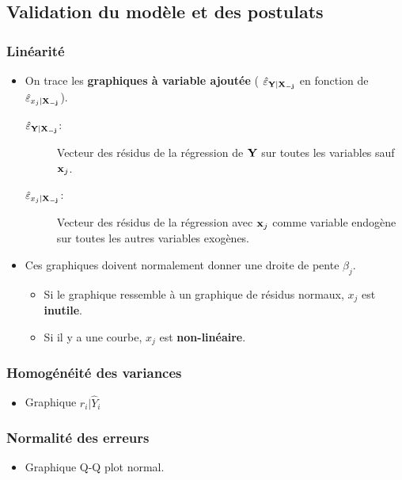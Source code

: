 \documentclass[10pt, french]{article}
\begin{document}
\begin{multicols*}{3}
\subsection*{Validation du modèle et des postulats}
\subsubsection*{Linéarité}
\begin{itemize}
\item On trace les \textbf{graphiques à variable ajoutée} ( $\hat{\varepsilon}_{\mathbf{Y} | \mathbf{X_{-j}}}$ en fonction de $\hat{\varepsilon}_{x_j | \mathbf{X_{-j}}}$).
\begin{description}
	\item[$\hat{\varepsilon}_{\mathbf{Y} | \mathbf{X_{-j}}}$: ] Vecteur des résidus de la régression de $\mathbf{Y}$ sur toutes les variables sauf $\mathbf{x}_{j}$.
	\item[$\hat{\varepsilon}_{x_j | \mathbf{X_{-j}}}$: ] Vecteur des résidus de la régression avec $\mathbf{x}_j$ comme variable endogène sur toutes les autres variables exogènes.
\end{description}
\item Ces graphiques doivent normalement donner une droite de pente $\beta_j$.
\begin{itemize}
	\item Si le graphique ressemble à un graphique de résidus normaux, $x_j$ est \textbf{inutile}.
	\item Si il y a une courbe, $x_j$ est \textbf{non-linéaire}.
\end{itemize}
\end{itemize}

\subsubsection*{Homogénéité des variances}
\begin{itemize}
\item Graphique $r_i | \hat{Y}_i$
\end{itemize}

\subsubsection*{Normalité des erreurs}

\begin{itemize}
\item Graphique Q-Q plot normal.
\end{itemize}


\end{multicols*}
\end{document}
